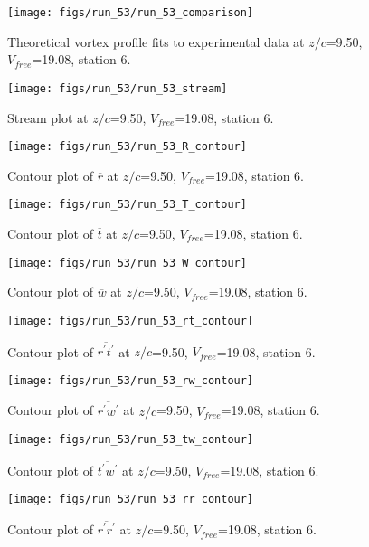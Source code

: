 \begin{figure}[H]
\centering
\texttt{[image: figs/run\_53/run\_53\_comparison]}
\caption{Theoretical vortex profile fits to experimental data at $z/c$=9.50, $V_{free}$=19.08, station 6.}
\end{figure}


\begin{figure}[H]
\centering
\texttt{[image: figs/run\_53/run\_53\_stream]}
\caption{Stream plot at $z/c$=9.50, $V_{free}$=19.08, station 6.}
\end{figure}


\begin{figure}[H]
\centering
\texttt{[image: figs/run\_53/run\_53\_R\_contour]}
\caption{Contour plot of $\overline{r}$ at $z/c$=9.50, $V_{free}$=19.08, station 6.}
\end{figure}


\begin{figure}[H]
\centering
\texttt{[image: figs/run\_53/run\_53\_T\_contour]}
\caption{Contour plot of $\overline{t}$ at $z/c$=9.50, $V_{free}$=19.08, station 6.}
\end{figure}


\begin{figure}[H]
\centering
\texttt{[image: figs/run\_53/run\_53\_W\_contour]}
\caption{Contour plot of $\overline{w}$ at $z/c$=9.50, $V_{free}$=19.08, station 6.}
\end{figure}


\begin{figure}[H]
\centering
\texttt{[image: figs/run\_53/run\_53\_rt\_contour]}
\caption{Contour plot of $\overline{r^\prime t^\prime}$ at $z/c$=9.50, $V_{free}$=19.08, station 6.}
\end{figure}


\begin{figure}[H]
\centering
\texttt{[image: figs/run\_53/run\_53\_rw\_contour]}
\caption{Contour plot of $\overline{r^\prime w^\prime}$ at $z/c$=9.50, $V_{free}$=19.08, station 6.}
\end{figure}


\begin{figure}[H]
\centering
\texttt{[image: figs/run\_53/run\_53\_tw\_contour]}
\caption{Contour plot of $\overline{t^\prime w^\prime}$ at $z/c$=9.50, $V_{free}$=19.08, station 6.}
\end{figure}


\begin{figure}[H]
\centering
\texttt{[image: figs/run\_53/run\_53\_rr\_contour]}
\caption{Contour plot of $\overline{r^\prime r^\prime}$ at $z/c$=9.50, $V_{free}$=19.08, station 6.}
\end{figure}


